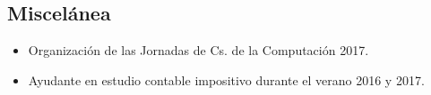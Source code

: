 \documentclass[10pt,a4paper]{moderncv}        %
\begin{document}
  \subsection{Miscelánea}
    \begin{itemize}
      \item Organizaci\'on de las Jornadas de Cs. de la Computaci\'on 2017.
      \item Ayudante en estudio contable impositivo durante el verano 2016 y 2017.
    \end{itemize}

\end{document}
